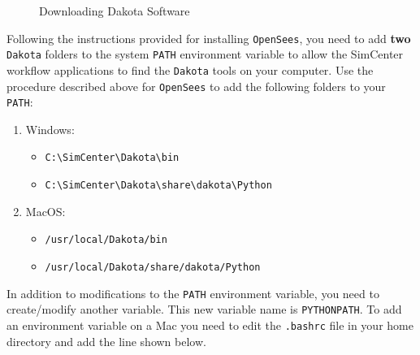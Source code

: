 \begin{figure}[!htbp]
  \caption{Downloading Dakota Software}
  \label{fig:dakota_installation}
\end{figure}

Following the instructions provided for installing \texttt{OpenSees}, you need to add \textbf{two} \texttt{Dakota} folders to the system \texttt{PATH} environment variable to allow the SimCenter
workflow applications to find the \texttt{Dakota} tools on your computer. Use
the procedure described above for \texttt{OpenSees} to add the following
folders to your \texttt{PATH}:

\begin{enumerate}
\item Windows:
\begin{itemize}
    \item \texttt{C:\textbackslash SimCenter\textbackslash Dakota\textbackslash bin}
    \item \texttt{C:\textbackslash SimCenter\textbackslash Dakota\textbackslash share\textbackslash dakota\textbackslash Python}
\end{itemize}

\item MacOS:
\begin{itemize}
    \item \texttt{/usr/local/Dakota/bin}
    \item \texttt{/usr/local/Dakota/share/dakota/Python}
\end{itemize}
\end{enumerate}

In addition to modifications to the \texttt{PATH} environment variable, you need to create/modify another variable. This new variable name is \texttt{PYTHONPATH}. To add an environment variable on a Mac you need to edit the \texttt{.bashrc} file in your home directory and add the line shown below.

